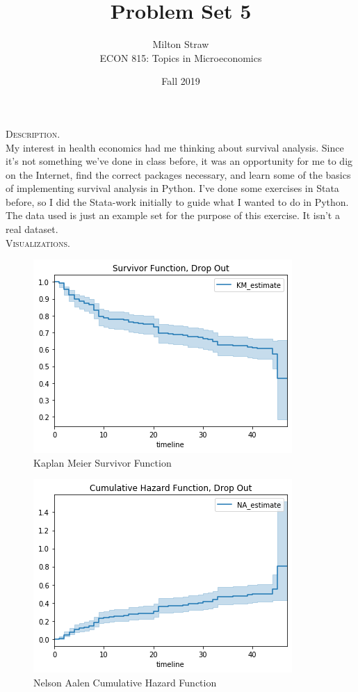 \documentclass[12pt]{article}
\begin{document}

\title{Problem Set 5}
\author{Milton Straw\\
ECON 815: Topics in Microeconomics}
\date{Fall 2019}
\maketitle

\textsc{Description.}\\

My interest in health economics had me thinking about survival analysis. Since it's not something we've done in class before, it was an opportunity for me to dig on the Internet, find the correct packages necessary, and learn some of the basics of implementing survival analysis in Python. I've done some exercises in Stata before, so I did the Stata-work initially to guide what I wanted to do in Python. \\

The data used is just an example set for the purpose of this exercise. It isn't a real dataset.\\

\textsc{Visualizations.}

\begin{figure}[!h]
	\centering
	\centering
	\caption{Kaplan Meier Survivor Function}
	\label{fig:kaplanmeier}
	\includegraphics[scale=0.5]{fig1.png}
\end{figure}

\begin{figure}[!h]
	\centering
	\centering
	\caption{Nelson Aalen Cumulative Hazard Function}
	\label{fig:nelsonaalen}
	\includegraphics[scale=0.5]{fig2.png}
\end{figure}
\end{document}
